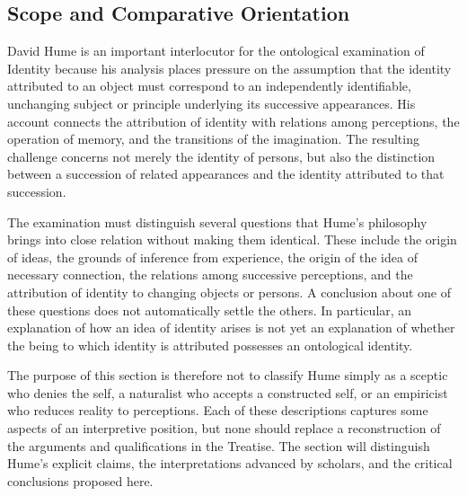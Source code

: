 
\subsection*{Scope and Comparative Orientation}

\label{para:VS.B01.P01.C08.S09.SS01.P001}

David Hume is an important interlocutor for the ontological
examination of Identity because his analysis places pressure
on the assumption that the identity attributed to an object
must correspond to an independently identifiable,
unchanging subject or principle underlying its successive
appearances. His account connects the attribution of identity
with relations among perceptions, the operation of memory,
and the transitions of the imagination. The resulting
challenge concerns not merely the identity of persons, but
also the distinction between a succession of related
appearances and the identity attributed to that succession.
\cite[1.4.6.5--14, SBN 253--258]{HumeTreatise}

\label{para:VS.B01.P01.C08.S09.SS01.P002}

The examination must distinguish several questions that
Hume's philosophy brings into close relation without making
them identical. These include the origin of ideas, the
grounds of inference from experience, the origin of the idea
of necessary connection, the relations among successive
perceptions, and the attribution of identity to changing
objects or persons. A conclusion about one of these questions
does not automatically settle the others. In particular,
an explanation of how an idea of identity arises is not
yet an explanation of whether the being to which identity
is attributed possesses an ontological identity.

\label{para:VS.B01.P01.C08.S09.SS01.P003}

The purpose of this section is therefore not to classify
Hume simply as a sceptic who denies the self, a naturalist
who accepts a constructed self, or an empiricist who reduces
reality to perceptions. Each of these descriptions captures
some aspects of an interpretive position, but none should
replace a reconstruction of the arguments and qualifications
in the Treatise. The section will distinguish Hume's
explicit claims, the interpretations advanced by scholars,
and the critical conclusions proposed here.

